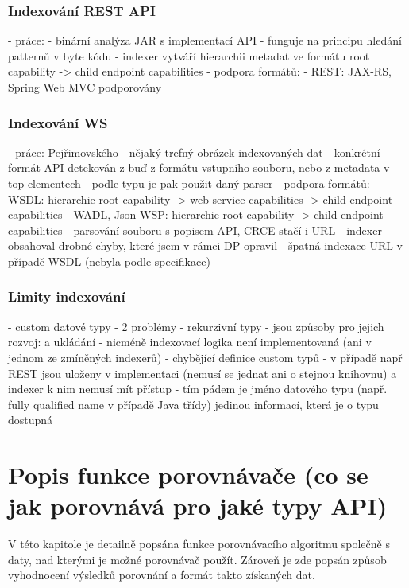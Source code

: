 \documentclass[czech,DP]{thesiskiv}
\begin{document}
\subsection{Indexování REST API}

- práce: \cite{hessova2015rest}
- binární analýza JAR s implementací API
- funguje na principu hledání patternů v byte kódu
- indexer vytváří hierarchii metadat ve formátu root capability -> child endpoint capabilities
- podpora formátů:
	- REST: JAX-RS, Spring Web MVC podporovány

\subsection{Indexování WS}

- práce: Pejřimovského \cite{pejrimovsky2015ws}
- nějaký trefný obrázek indexovaných dat
- konkrétní formát API detekován z buď z formátu vstupního souboru, nebo z metadata v top elementech
- podle typu je pak použit daný parser
- podpora formátů:
	- WSDL: hierarchie root capability -> web service capabilities -> child endpoint capabilities
	- WADL, Json-WSP: hierarchie root capability -> child endpoint capabilities
	- parsování souboru s popisem API, CRCE stačí i URL
- indexer obsahoval drobné chyby, které jsem v rámci DP opravil
	- špatná indexace URL v případě WSDL (nebyla podle specifikace)

\subsection{Limity indexování}

 - custom datové typy
 - 2 problémy
	- rekurzivní typy
		- jsou způsoby pro jejich rozvoj: \cite{abadi1995subytping} a ukládání
		- nicméně indexovací logika není implementovaná (ani v jednom ze zmíněných indexerů)
	- chybějící definice custom typů
		- v případě např REST jsou uloženy v implementaci (nemusí se jednat ani o stejnou knihovnu) a indexer k nim nemusí mít přístup
		- tím pádem je jméno datového typu (např. fully qualified name v případě Java třídy) jedinou informací, která je o typu dostupná

\chapter{Popis funkce porovnávače (co se jak porovnává pro jaké typy API)}

V této kapitole je detailně popsána funkce porovnávacího algoritmu společně s daty, nad kterými je možné porovnávač použít. Zároveň je zde popsán způsob vyhodnocení výsledků porovnání a formát takto získaných dat.
\end{document}
